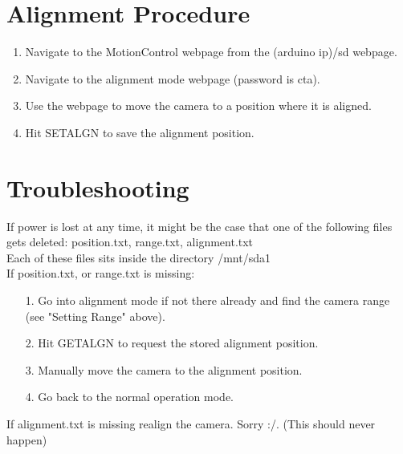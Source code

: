 \documentclass[11pt]{article}
\begin{document}
\section{Alignment Procedure}
\begin{enumerate}
	\item Navigate to the MotionControl webpage from the (arduino ip)/sd webpage.
	\item Navigate to the alignment mode webpage (password is cta).
	\item Use the webpage to move the camera to a position where it is aligned.
	\item Hit SETALGN to save the alignment position.
\end{enumerate}
\section{Troubleshooting}
If power is lost at any time, it might be the case that one of the following files gets deleted: position.txt, range.txt, alignment.txt\\[15pt]
Each of these files sits inside the directory /mnt/sda1\\[15pt]
If position.txt, or range.txt is missing:
\begin{enumerate}
\item[1.] Go into alignment mode if not there already and find the camera range (see "Setting Range" above).
\item[2.] Hit GETALGN to request the stored alignment position.
\item[3.] Manually move the camera to the alignment position.
\item[4.] Go back to the normal operation mode.
\end{enumerate}
If alignment.txt is missing realign the camera. Sorry :/. (This should never happen)
\end{document}
